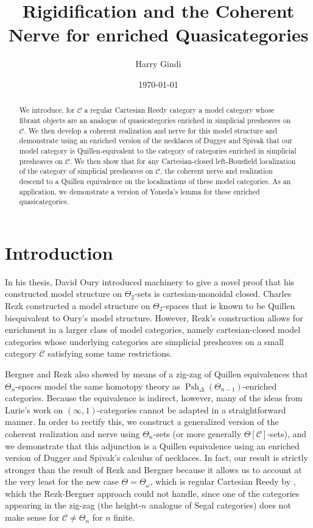 \documentclass{amsart}
\title[The Enriched Coherent Nerve]{Rigidification and the Coherent Nerve for enriched Quasicategories}
\author[H. Gindi]{Harry Gindi}
\date{\today}
\numberwithin{equation}{section}
\theoremstyle{plain}   %
\theoremstyle{remark}
\theoremstyle{plain}
\DeclareMathOperator{\Psh}{Psh}
\newcommand{\C}{\ensuremath{\mathcal{C}}}
\begin{document}
\begin{abstract}
	We introduce, for \(\C\) a regular Cartesian Reedy category a model category whose fibrant objects are an analogue of quasicategories enriched in simplicial presheaves on \(\C\).  We then develop a coherent realization and nerve for this model structure and demonstrate using an enriched version of the necklaces of Dugger and Spivak that our model category is Quillen-equivalent to the category of categories enriched in simplicial presheaves on \(\C\).  We then show that for any Cartesian-closed left-Bousfield localization of the category of simplicial presheaves on \(\C\), the coherent nerve and realization descend to a Quillen equivalence on the localizations of these model categories. As an application, we demonstrate a version of Yoneda's lemma for these enriched quasicategories.
\end{abstract}

\maketitle



\section*{Introduction}
In his thesis, David Oury introduced machinery to give a novel proof that his constructed model structure on \(\Theta_2\)-sets is cartesian-monoidal closed. Charles Rezk constructed a model structure on \(\Theta_2\)-spaces that is known to be Quillen biequivalent to Oury's model structure.  However,  Rezk's construction allows for enrichment in a larger class of model categories, namely cartesian-closed model categories whose underlying categories are simplicial presheaves on a small category \(\C\) satisfying some tame restrictions.

Bergner and Rezk also showed by means of a zig-zag of Quillen equivalences that \(\Theta_n\)-spaces model the same homotopy theory as \(\Psh_\Delta(\Theta_{n-1})\)-enriched categories.  Because the equivalence is indirect, however, many of the ideas from Lurie's work on \((\infty,1)\)-categories cannot be adapted in a straightforward manner.  In order to rectify this, we construct a generalized version of the coherent realization and nerve using \(\Theta_n\)-sets (or more generally \(\Theta[\C]\)-sets), and we demonstrate that this adjunction is a Quillen equivalence using an enriched version of Dugger and Spivak's calculus of necklaces. In fact, our result is strictly stronger than the result of Rezk and Bergner because it allows us to account at the very least for the new case \(\Theta=\Theta_\omega\), which is regular Cartesian Reedy by \cite{berger-iterated-wreath}, which the Rezk-Bergner approach could not handle, since one of the categories appearing in the zig-zag (the height-\(n\) analogue of Segal categories) does not make sense for \(\C\neq \Theta_n\) for \(n\) finite.  
\end{document}
